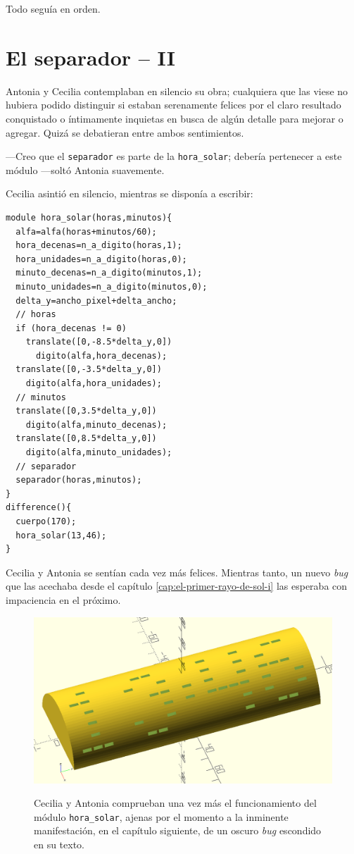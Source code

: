 Todo seguía en orden.

\section{El separador -- II}

Antonia y Cecilia contemplaban en silencio su obra; cualquiera que las
viese no hubiera podido distinguir si estaban serenamente felices por
el claro resultado conquistado o íntimamente inquietas en busca de
algún detalle para mejorar o agregar. Quizá se debatieran entre ambos
sentimientos.

---Creo que el \lstinline!separador! es parte de la
\lstinline!hora_solar!; debería pertenecer a este módulo ---soltó
Antonia suavemente.

Cecilia asintió en silencio, mientras se disponía a escribir:

\begin{lstlisting}
module hora_solar(horas,minutos){
  alfa=alfa(horas+minutos/60);
  hora_decenas=n_a_digito(horas,1);
  hora_unidades=n_a_digito(horas,0);
  minuto_decenas=n_a_digito(minutos,1);
  minuto_unidades=n_a_digito(minutos,0);                    
  delta_y=ancho_pixel+delta_ancho;
  // horas    
  if (hora_decenas != 0)
    translate([0,-8.5*delta_y,0])
      digito(alfa,hora_decenas);
  translate([0,-3.5*delta_y,0])
    digito(alfa,hora_unidades);  
  // minutos
  translate([0,3.5*delta_y,0])
    digito(alfa,minuto_decenas);
  translate([0,8.5*delta_y,0])
    digito(alfa,minuto_unidades);  
  // separador
  separador(horas,minutos);
}
difference(){
  cuerpo(170);
  hora_solar(13,46);
}
\end{lstlisting}%

  

Cecilia y Antonia se sentían cada vez más felices. Mientras tanto, un
nuevo \emph{bug} que las acechaba desde el capítulo
\ref{cap:el-primer-rayo-de-sol-i} las esperaba con impaciencia en el
próximo.


\begin{figure}[ht]
  \centering
  \includegraphics[width=.9\textwidth]{imagenes/13_46}
  \caption{Cecilia y Antonia comprueban una vez más el funcionamiento
    del módulo \lstinline!hora_solar!, ajenas por el momento a la
    inminente manifestación, en el capítulo siguiente, de un oscuro
    \emph{bug} escondido en su texto.}\iftoggle{libro}{\vspace{128in}}{}
  \label{fig:13_46}
\end{figure}

